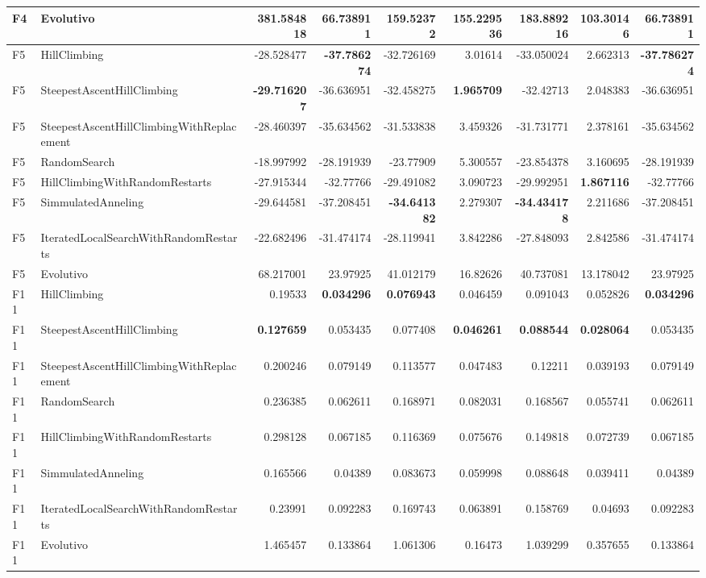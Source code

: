 \begin{tabular}{llrrrrrrr}
F4 & Evolutivo & 381.584818 & 66.738911 & 159.52372 & 155.229536 & 183.889216 & 103.30146 & 66.738911 \\ 
\midrule
F5 & HillClimbing & -28.528477 & \textbf{-37.786274} & -32.726169 & 3.01614 & -33.050024 & 2.662313 & \textbf{-37.786274} \\ 
F5 & SteepestAscentHillClimbing & \textbf{-29.716207} & -36.636951 & -32.458275 & \textbf{1.965709} & -32.42713 & 2.048383 & -36.636951 \\ 
F5 & SteepestAscentHillClimbingWithReplacement & -28.460397 & -35.634562 & -31.533838 & 3.459326 & -31.731771 & 2.378161 & -35.634562 \\ 
F5 & RandomSearch & -18.997992 & -28.191939 & -23.77909 & 5.300557 & -23.854378 & 3.160695 & -28.191939 \\ 
F5 & HillClimbingWithRandomRestarts & -27.915344 & -32.77766 & -29.491082 & 3.090723 & -29.992951 & \textbf{1.867116} & -32.77766 \\ 
F5 & SimmulatedAnneling & -29.644581 & -37.208451 & \textbf{-34.641382} & 2.279307 & \textbf{-34.434178} & 2.211686 & -37.208451 \\ 
F5 & IteratedLocalSearchWithRandomRestarts & -22.682496 & -31.474174 & -28.119941 & 3.842286 & -27.848093 & 2.842586 & -31.474174 \\ 
F5 & Evolutivo & 68.217001 & 23.97925 & 41.012179 & 16.82626 & 40.737081 & 13.178042 & 23.97925 \\ 
\midrule
F11 & HillClimbing & 0.19533 & \textbf{0.034296} & \textbf{0.076943} & 0.046459 & 0.091043 & 0.052826 & \textbf{0.034296} \\ 
F11 & SteepestAscentHillClimbing & \textbf{0.127659} & 0.053435 & 0.077408 & \textbf{0.046261} & \textbf{0.088544} & \textbf{0.028064} & 0.053435 \\ 
F11 & SteepestAscentHillClimbingWithReplacement & 0.200246 & 0.079149 & 0.113577 & 0.047483 & 0.12211 & 0.039193 & 0.079149 \\ 
F11 & RandomSearch & 0.236385 & 0.062611 & 0.168971 & 0.082031 & 0.168567 & 0.055741 & 0.062611 \\ 
F11 & HillClimbingWithRandomRestarts & 0.298128 & 0.067185 & 0.116369 & 0.075676 & 0.149818 & 0.072739 & 0.067185 \\ 
F11 & SimmulatedAnneling & 0.165566 & 0.04389 & 0.083673 & 0.059998 & 0.088648 & 0.039411 & 0.04389 \\ 
F11 & IteratedLocalSearchWithRandomRestarts & 0.23991 & 0.092283 & 0.169743 & 0.063891 & 0.158769 & 0.04693 & 0.092283 \\ 
F11 & Evolutivo & 1.465457 & 0.133864 & 1.061306 & 0.16473 & 1.039299 & 0.357655 & 0.133864 \\ 
\bottomrule
\end{tabular}
